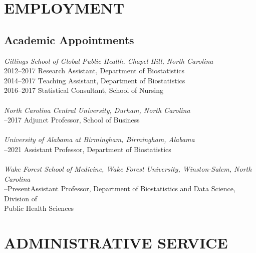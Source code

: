 \documentclass[11pt]{cv_wakeforest_article}
\newcommand{\AR}[1]{#1}  %
\newcommand{\mysection}[1]{\section*{#1}}
\newcommand{\mysubsection}[1]{\subsection*{#1}}
\begin{document}
\mysection{EMPLOYMENT}
\mysubsection{Academic Appointments}


\begin{tabbing}

\hskip 0.2in \emph{Gillings School of Global Public Health, Chapel Hill, North Carolina}\\

\hspace{0.25in} \= 2012--2017 \hspace{0.7in} \= Research Assistant, Department of Biostatistics\\

\hspace{0.25in} \= 2014--2017 \hspace{0.7in} \= Teaching Assistant, Department of Biostatistics\\

\hspace{0.25in} \= 2016--2017 \hspace{0.7in} \= Statistical Consultant, School of Nursing\\
\\


\hskip 0.2in \emph{North Carolina Central University, Durham, North Carolina}\\
--2017\> Adjunct Professor, School of Business\\
\\

\hskip 0.2in \emph{University of Alabama at Birmingham, Birmingham, Alabama}\\
--2021\> Assistant Professor, Department of Biostatistics\\
\\

\hskip 0.2in \emph{Wake Forest School of Medicine, Wake Forest University, Winston-Salem, North Carolina}\\
--Present\>\AR{Assistant Professor,  Department of Biostatistics and Data Science, Division of}\\\>\>\hspace{0.25in}\AR{Public Health Sciences}\\

\end{tabbing}

\mysection{ADMINISTRATIVE SERVICE}

\end{document}
